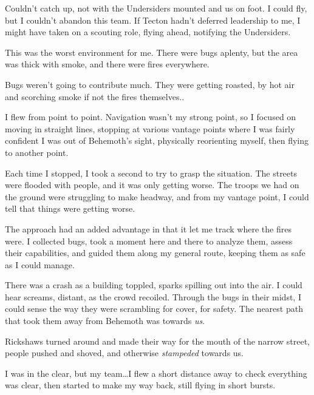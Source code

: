 





Couldn't catch up, not with the Undersiders mounted and us on foot.  I could fly, but I couldn't abandon this team.  If Tecton hadn't deferred leadership to me, I might have taken on a scouting role, flying ahead, notifying the Undersiders.



This was the worst environment for me.  There were bugs aplenty, but the area was thick with smoke, and there were fires everywhere.



Bugs weren't going to contribute much.  They were getting roasted, by hot air and scorching smoke if not the fires themselves..



I flew from point to point.  Navigation wasn't my strong point, so I focused on moving in straight lines, stopping at various vantage points where I was fairly confident I was out of Behemoth's sight, physically reorienting myself, then flying to another point.



Each time I stopped, I took a second to try to grasp the situation.  The streets were flooded with people, and it was only getting worse.  The troops we had on the ground were struggling to make headway, and from my vantage point, I could tell that things were getting worse.



The approach had an added advantage in that it let me track where the fires were.  I collected bugs, took a moment here and there to analyze them, assess their capabilities, and guided them along my general route, keeping them as safe as I could manage.



There was a crash as a building toppled, sparks spilling out into the air.  I could hear screams, distant, as the crowd recoiled.  Through the bugs in their midst, I could sense the way they were scrambling for cover, for safety.  The nearest path that took them away from Behemoth was towards \emph{us}.



Rickshaws turned around and made their way for the mouth of the narrow street, people pushed and shoved, and otherwise \emph{stampeded} towards us.



I was in the clear, but my team\ldots  I flew a short distance away to check everything was clear, then started to make my way back, still flying in short bursts.



